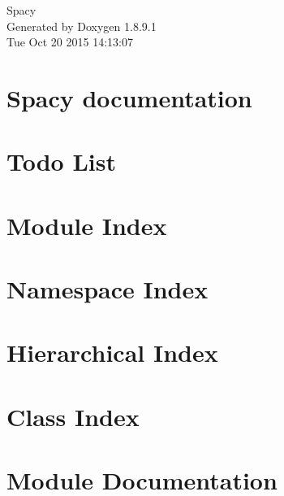 \documentclass[twoside]{book}
\newcommand{\+}{\discretionary{\mbox{\scriptsize$\hookleftarrow$}}{}{}}
\newcommand{\clearemptydoublepage}{%
  \newpage{\pagestyle{empty}\cleardoublepage}%
}
\begin{document}
\hypersetup{pageanchor=false,
             bookmarks=true,
             bookmarksnumbered=true,
             pdfencoding=unicode
            }
\begin{titlepage}
\vspace*{7cm}
\begin{center}%
{\Large Spacy }\\
\vspace*{1cm}
{\large Generated by Doxygen 1.8.9.1}\\
\vspace*{0.5cm}
{\small Tue Oct 20 2015 14:13:07}\\
\end{center}
\end{titlepage}
\clearemptydoublepage
\tableofcontents
\clearemptydoublepage
{}
\hypersetup{pageanchor=true}

\chapter{Spacy documentation}
\label{index}\hypertarget{index}{}
\chapter{Todo List}
\label{todo}
\hypertarget{todo}{}

\chapter{Module Index}

\chapter{Namespace Index}

\chapter{Hierarchical Index}

\chapter{Class Index}

\chapter{Module Documentation}















\end{document}
